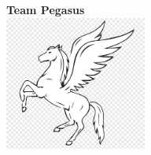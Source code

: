 \begin{center}
    \thispagestyle{empty}
    \vspace*{\fill}
    \textbf{\large Team Pegasus}\\
    \includegraphics[width=0.35\textwidth]{img/pegasus.png}\\
    \vspace*{\fill}
\end{center}